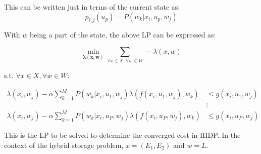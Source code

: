 \documentclass{article}
\begin{document}
	
	
	
	This can be written just in terms of the current state as:
	\begin{displaymath} 
	p_{i,j}(u_{p})=P(w_{k} | x_{i},u_{p},w_{j})
	\end{displaymath}
	
	With $w$ being a part of the state, the above LP can be expressed as:
	
	\begin{equation}
	\min_{\boldsymbol{\lambda(x,w)}} \sum_{\forall x \in X,\forall w \in W} -\lambda(x,w)
	\end{equation}
	
	s.t. $\forall x \in X,\forall w \in W$:
	
	
	\begin{align*}
	\lambda(x_{i},w_{j})-\alpha\sum_{k=1}^{M}P(w_{k} | x_{i},u_{1},w_{j})\lambda(f(x_{i},u_{1},w_{j}),w_{k}) &\leq g(x_{i},u_{1},w_{j}) \\
	&\vdots\\
	\lambda(x_{i},w_{j})-\alpha\sum_{k=1}^{M}P(w_{k} | x_{i},u_{P},w_{j})\lambda(f(x_{i},u_{P},w_{j}),w_{k}) &\leq g(x_{i},u_{P},w_{j})
	\end{align*}
	
	This is the LP to be solved to determine the converged cost in IHDP. In the context of the hybrid storage problem, $x=(E_{1},E_{2})$ and $w=L$.
	
\end{document}
